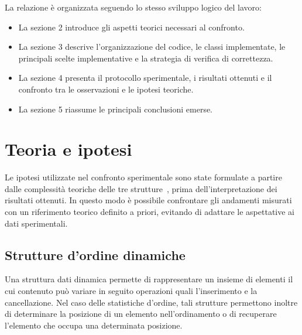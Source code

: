\documentclass[a4paper,11pt]{article}
\begin{document}
La relazione è organizzata seguendo lo stesso sviluppo logico del lavoro:
\begin{itemize}
    \item La sezione 2 introduce gli aspetti teorici necessari al confronto.
    
    \item La sezione 3 descrive l'organizzazione del codice, le classi implementate, le principali scelte implementative e la strategia di verifica di correttezza.
    
    \item La sezione 4 presenta il protocollo sperimentale, i risultati ottenuti e il confronto tra le osservazioni e le ipotesi teoriche.
    
    \item La sezione 5 riassume le principali conclusioni emerse.
\end{itemize}



\clearpage
\section{Teoria e ipotesi}
Le ipotesi utilizzate nel confronto sperimentale sono state formulate a partire dalle complessità teoriche delle tre strutture~\cite{cormen2009,slide-asd-2025}, prima dell'interpretazione dei risultati ottenuti. In questo modo è possibile confrontare gli andamenti misurati con un riferimento teorico definito a priori, evitando di adattare le aspettative ai dati sperimentali.


\subsection{Strutture d'ordine dinamiche}
Una struttura dati dinamica permette di rappresentare un insieme di elementi il cui contenuto può variare in seguito operazioni quali l'inserimento e la cancellazione. Nel caso delle statistiche d'ordine, tali strutture permettono inoltre di determinare la posizione di un elemento nell'ordinamento o di recuperare l'elemento che occupa una determinata posizione.
\end{document}
